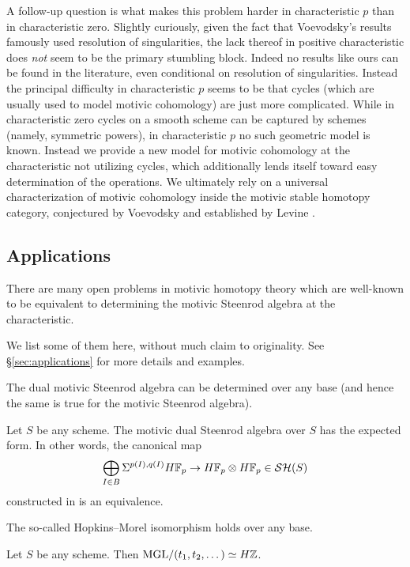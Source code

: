 \documentclass{amsart}
\numberwithin{proposition}{section}
\numberwithin{equation}{section}
\begin{document}
\begin{remark}
A follow-up question is what makes this problem harder in characteristic $p$ than in characteristic zero.
Slightly curiously, given the fact that Voevodsky's results famously used resolution of singularities, the lack thereof in positive characteristic does \emph{not} seem to be the primary stumbling block.
Indeed no results like ours can be found in the literature, even conditional on resolution of singularities.
Instead the principal difficulty in characteristic $p$ seems to be that cycles (which are usually used to model motivic cohomology) are just more complicated.
While in characteristic zero cycles on a smooth scheme can be captured by schemes (namely, symmetric powers), in characteristic $p$ no such geometric model is known.
Instead we provide a new model for motivic cohomology at the characteristic not utilizing cycles, which additionally lends itself toward easy determination of the operations.
We ultimately rely on a universal characterization of motivic cohomology inside the motivic stable homotopy category, conjectured by Voevodsky \cite[Conjecture~10]{voevodsky-slice-filtration} and established by Levine \cite[Theorem~10.5.1]{levine2008homotopy}.
\end{remark}

\subsection{Applications} \label{subsec:intro-app}
There are many open problems in motivic homotopy theory which are well-known to be equivalent to determining the motivic Steenrod algebra at the characteristic.

We list some of them here, without much claim to originality.
See \S\ref{sec:applications} for more details and examples.

The dual motivic Steenrod algebra can be determined over any base (and hence the same is true for the motivic Steenrod algebra).
\begin{theorem}
Let $S$ be any scheme.
The motivic dual Steenrod algebra over $S$ has the expected form.
In other words, the canonical map \[ \bigoplus_{I \in B}\Sigma^{p(I),q(I)} H\mathbb{F}_p \to H\mathbb{F}_p \otimes H\mathbb{F}_p \in \mathcal{SH}(S) \] constructed in \cite[Theorem 10.26]{spitzweck2012commutative} is an equivalence.
\end{theorem}

The so-called Hopkins--Morel isomorphism holds over any base.
\begin{theorem}
Let $S$ be any scheme.
Then $\mathrm{MGL}/(t_1, t_2, \dots) \simeq H\mathbb{Z}$.
\end{theorem}
\end{document}
